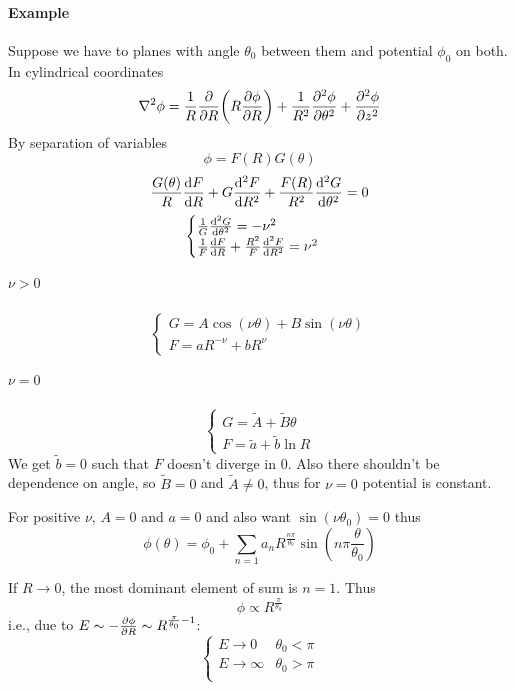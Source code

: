 \paragraph{Example}
Suppose we have to planes with angle $\theta_0$ between them and potential $\phi_0$ on both. In cylindrical coordinates
$$\laplacian{\phi} = \frac{1}{R} \pdv{R} \qty(R\pdv{\phi}{R}) + \frac{1}{R^2} \pdv[2]{\phi}{\theta} + \pdv[2]{\phi}{z} $$
By separation of variables
$$\phi = F(R)G(\theta)$$
$$\frac{G(\theta)}{R} \dv{F}{R} + G\dv[2]{F}{R} + \frac{F(R)}{R^2} \dv[2]{G}{\theta} = 0$$
$$\begin{cases}
\frac{1}{G} \dv[2]{G}{\theta} =-\nu^2 \\
\frac{1}{F} \dv{F}{R} + \frac{R^2}{F}\dv[2]{F}{R} = \nu^2
\end{cases}$$
\subparagraph{$\nu>0$}
$$\begin{cases}
G = A\cos(\nu \theta) + B\sin(\nu \theta)\\
F = aR^{-\nu} + bR^{\nu}
\end{cases}$$
\subparagraph{$\nu=0$}
$$\begin{cases}
G=\tilde{A}+\tilde{B}\theta\\
F=\tilde{a}+\tilde{b}\ln R
\end{cases}$$
We get $\tilde{b}=0$ such that $F$ doesn't diverge in 0. Also there shouldn't be dependence on angle, so $\tilde{B}=0$ and $\tilde{A} \neq 0$, thus for $\nu=0$ potential is constant.

For positive $\nu$, $A=0$ and $a=0$ and also want $\sin(\nu \theta_0) = 0$ thus
$$\phi(\theta) = \phi_0 + \sum_{n=1} a_n R^{\frac{n\pi}{\theta_0}} \sin(n\pi \frac{\theta}{\theta_0}) $$

If $R \to 0$, the most dominant element of sum is $n=1$. Thus
$$\phi \propto R^{\frac{\pi}{\theta_0}}$$
i.e., due to $E \sim -\pdv{\phi}{R} \sim R^{\frac{\pi}{\theta_0} - 1}$:
$$\begin{cases}
E \to 0 & \theta_0 < \pi \\
E \to \infty & \theta_0 > \pi \\
\end{cases}$$